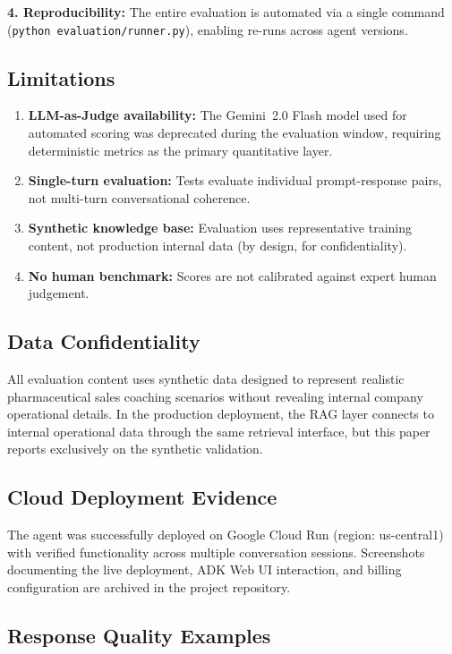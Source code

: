 \documentclass[10pt,twocolumn,a4paper]{article}
\begin{document}
\textbf{4. Reproducibility:} The entire evaluation is automated via a single command (\texttt{python evaluation/runner.py}), enabling re-runs across agent versions.

\subsection{Limitations}

\begin{enumerate}[leftmargin=*,noitemsep,topsep=2pt]
    \item \textbf{LLM-as-Judge availability:} The Gemini~2.0 Flash model used for automated scoring was deprecated during the evaluation window, requiring deterministic metrics as the primary quantitative layer.
    \item \textbf{Single-turn evaluation:} Tests evaluate individual prompt-response pairs, not multi-turn conversational coherence.
    \item \textbf{Synthetic knowledge base:} Evaluation uses representative training content, not production internal data (by design, for confidentiality).
    \item \textbf{No human benchmark:} Scores are not calibrated against expert human judgement.
\end{enumerate}

\subsection{Data Confidentiality}

All evaluation content uses synthetic data designed to represent realistic pharmaceutical sales coaching scenarios without revealing internal company operational details. In the production deployment, the RAG layer connects to internal operational data through the same retrieval interface, but this paper reports exclusively on the synthetic validation.

\subsection{Cloud Deployment Evidence}

The agent was successfully deployed on Google Cloud Run (region: us-central1) with verified functionality across multiple conversation sessions. Screenshots documenting the live deployment, ADK Web UI interaction, and billing configuration are archived in the project repository.

\subsection{Response Quality Examples}
\end{document}
